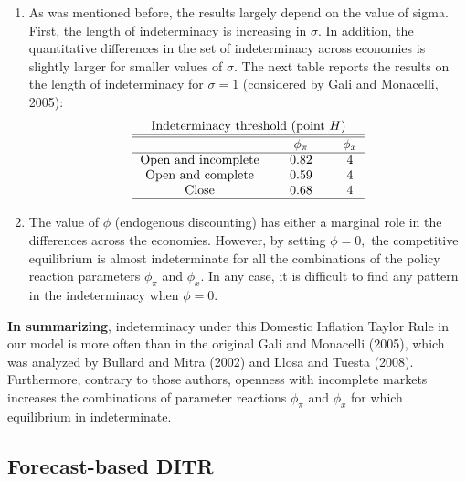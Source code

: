 \documentclass{article}
\begin{document}
\begin{enumerate}
\item As was mentioned before, the results largely depend on the value of
sigma. First, the length of indeterminacy is increasing in $\sigma .$ In
addition, the quantitative differences in the set of indeterminacy across
economies is slightly larger for smaller values of $\sigma .$ The next table
reports the results on the length of indeterminacy for $\sigma =1$
(considered by Gali and Monacelli, 2005):%
\begin{equation*}
\begin{tabular}{lcccc}
\multicolumn{5}{c}{Indeterminacy threshold (point $H)$} \\ \hline\hline
&  & $\phi _{\pi }$ &  & $\phi _{x}$ \\ \hline
\multicolumn{1}{c}{Open and incomplete} &  & $0.82$ &  & $4$ \\ 
\multicolumn{1}{c}{Open and complete} &  & $0.59$ &  & $4$ \\ 
\multicolumn{1}{c}{Close} &  & $0.68$ &  & $4$ \\ \hline
\end{tabular}%
\end{equation*}

\item The value of $\phi $ (endogenous discounting) has either a marginal
role in the differences across the economies. However, by setting $\phi =0,$
the competitive equilibrium is almost indeterminate for all the combinations
of the policy reaction parameters $\phi _{\pi }$ and $\phi _{x}.$ In any
case, it is difficult to find any pattern in the indeterminacy when $\phi
=0. $
\end{enumerate}

\textbf{In summarizing}, indeterminacy under this Domestic Inflation Taylor
Rule in our model is more often than in the original Gali and Monacelli
(2005), which was analyzed by Bullard and Mitra (2002) and Llosa and Tuesta
(2008). Furthermore, contrary to those authors, openness with incomplete
markets increases the combinations of parameter reactions $\phi _{\pi }$ and 
$\phi _{x}$ for which equilibrium in indeterminate.

\subsection{Forecast-based DITR}
\end{document}
